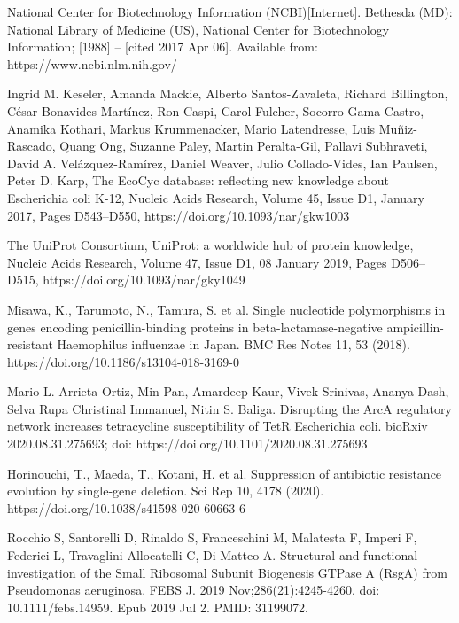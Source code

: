 \documentclass{article}
\begin{document}
\begin{thebibliography}{9}
 National Center for Biotechnology Information (NCBI)[Internet]. Bethesda (MD): National Library of Medicine (US), National Center for Biotechnology Information; [1988] – [cited 2017 Apr 06]. Available from: https://www.ncbi.nlm.nih.gov/
 
Ingrid M. Keseler, Amanda Mackie, Alberto Santos-Zavaleta, Richard Billington, César Bonavides-Martínez, Ron Caspi, Carol Fulcher, Socorro Gama-Castro, Anamika Kothari, Markus Krummenacker, Mario Latendresse, Luis Muñiz-Rascado, Quang Ong, Suzanne Paley, Martin Peralta-Gil, Pallavi Subhraveti, David A. Velázquez-Ramírez, Daniel Weaver, Julio Collado-Vides, Ian Paulsen, Peter D. Karp, The EcoCyc database: reflecting new knowledge about Escherichia coli K-12, Nucleic Acids Research, Volume 45, Issue D1, January 2017, Pages D543–D550, https://doi.org/10.1093/nar/gkw1003

The UniProt Consortium, UniProt: a worldwide hub of protein knowledge, Nucleic Acids Research, Volume 47, Issue D1, 08 January 2019, Pages D506–D515, https://doi.org/10.1093/nar/gky1049

Misawa, K., Tarumoto, N., Tamura, S. et al. Single nucleotide polymorphisms in genes encoding penicillin-binding proteins in beta-lactamase-negative ampicillin-resistant Haemophilus influenzae in Japan. BMC Res Notes 11, 53 (2018). https://doi.org/10.1186/s13104-018-3169-0

Mario L. Arrieta-Ortiz, Min Pan, Amardeep Kaur, Vivek Srinivas, Ananya Dash, Selva Rupa Christinal Immanuel, Nitin S. Baliga.  Disrupting the ArcA regulatory network increases tetracycline susceptibility of TetR Escherichia coli. 
bioRxiv 2020.08.31.275693; doi: https://doi.org/10.1101/2020.08.31.275693 

Horinouchi, T., Maeda, T., Kotani, H. et al. Suppression of antibiotic resistance evolution by single-gene deletion. Sci Rep 10, 4178 (2020). https://doi.org/10.1038/s41598-020-60663-6

Rocchio S, Santorelli D, Rinaldo S, Franceschini M, Malatesta F, Imperi F, Federici L, Travaglini-Allocatelli C, Di Matteo A. Structural and functional investigation of the Small Ribosomal Subunit Biogenesis GTPase A (RsgA) from Pseudomonas aeruginosa. FEBS J. 2019 Nov;286(21):4245-4260. doi: 10.1111/febs.14959. Epub 2019 Jul 2. PMID: 31199072.

\end{thebibliography}
\end{document}
